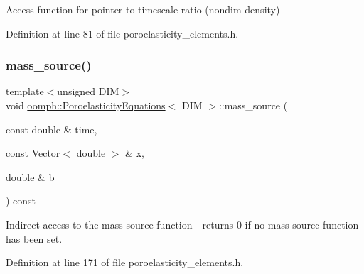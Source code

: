 Access function for pointer to timescale ratio (nondim density) 



Definition at line 81 of file poroelasticity\+\_\+elements.\+h.

\mbox{\label{classoomph_1_1PoroelasticityEquations_a316fd839c477c5d4619c894d51c221cd}} 
\subsubsection{\texorpdfstring{mass\+\_\+source()}{mass\_source()}}
{\footnotesize\ttfamily template$<$unsigned D\+IM$>$ \\
void \hyperlink{classoomph_1_1PoroelasticityEquations}{oomph\+::\+Poroelasticity\+Equations}$<$ D\+IM $>$\+::mass\+\_\+source (\begin{DoxyParamCaption}\item[{const double \&}]{time,  }\item[{const \hyperlink{classoomph_1_1Vector}{Vector}$<$ double $>$ \&}]{x,  }\item[{double \&}]{b }\end{DoxyParamCaption}) const\hspace{0.3cm}{\ttfamily [inline]}}



Indirect access to the mass source function -\/ returns 0 if no mass source function has been set. 



Definition at line 171 of file poroelasticity\+\_\+elements.\+h.

\mbox{\label{classoomph_1_1PoroelasticityEquations_a043aed834e1643f94afdf078d722a141}} 
